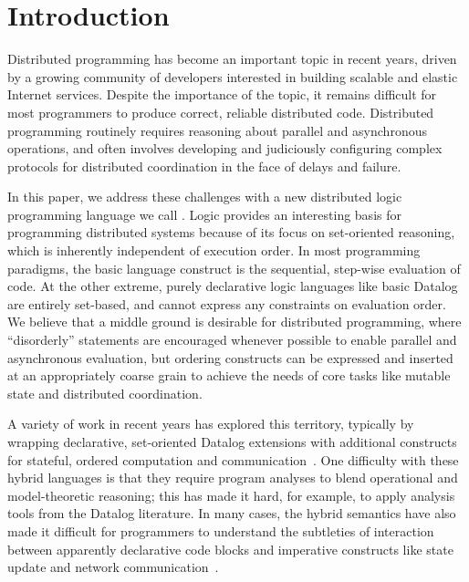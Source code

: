 \section{Introduction}
Distributed programming has become an important topic in recent years, driven by a growing community of developers interested in building scalable and elastic Internet services.  Despite the importance of the topic, it remains difficult for most programmers to produce correct, reliable distributed code.  Distributed programming routinely requires reasoning about parallel and asynchronous operations, and often involves developing and judiciously configuring complex protocols for distributed coordination in the face of delays and failure.

In this paper, we address these challenges with a new distributed logic programming language we call {\em \lang}.
Logic provides an interesting basis for programming distributed systems because of its focus on set-oriented reasoning, which is inherently independent of execution order.  In most programming paradigms, the basic language construct is the sequential, step-wise evaluation of code. At the other extreme, purely declarative logic languages like basic Datalog are entirely set-based, and cannot express any constraints on evaluation order.  We believe that  a middle ground is desirable for distributed programming, where ``disorderly'' statements are encouraged whenever possible to enable parallel and asynchronous evaluation, but ordering constructs can be expressed and inserted at an appropriately coarse grain to achieve the needs of core tasks like mutable state and distributed coordination.

A variety of work in recent years has explored this territory, typically by wrapping declarative, set-oriented Datalog extensions with additional constructs for stateful, ordered computation and communication~\cite{boon,reactors,meld,prologevents}.  One difficulty with these hybrid languages is that they require program analyses to blend operational and model-theoretic reasoning; this has made it hard, for example, to apply analysis tools from the Datalog literature.  In many cases, the hybrid semantics have also made it difficult for programmers to understand the subtleties of interaction between apparently declarative code blocks and imperative constructs like state update and network communication~\cite{Mao2009,navarro}.

